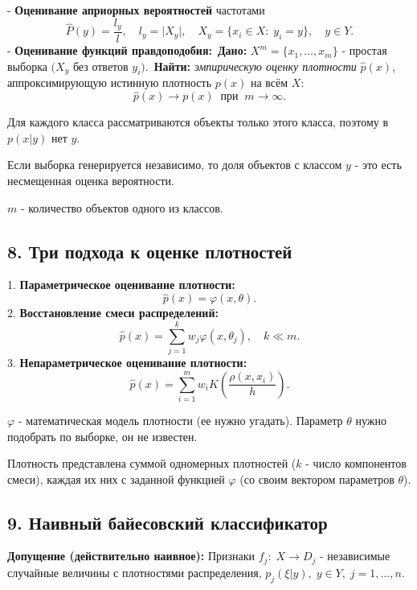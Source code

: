 - \textbf{Оценивание априорных вероятностей} частотами
$$\hat{P}{(y)} = \frac{l_y}{l}, \quad l_y = {\vert X_y \vert}, \quad X_y = {\lbrace x_i \in X : \; y_i = y \rbrace}, \quad y \in Y.$$
- \textbf{Оценивание функций правдоподобия:}\
\textbf{Дано:} $X^{m} = {\lbrace x_1, \ldots, x_m \rbrace}$ - простая выборка $(X_y$ без ответов $y_i)$.\
\textbf{Найти:} \textit{эмпирическую оценку плотности} $\hat{p}{(x)}$, аппроксимирующую
истинную плотность $p{(x)}$ на всём $X$:
$$\hat{p}{(x)} \rightarrow p{(x)} \;\; \text{при} \;\; m \rightarrow \infty.$$


Для каждого класса рассматриваются объекты только этого класса, поэтому в
$p{(x \vert y)}$ нет $y$.

Если выборка генерируется независимо, то доля объектов с классом $y$ - это
есть несмещенная оценка вероятности.

$m$ - количество объектов одного из классов.

\subsection{8. Три подхода к оценке плотностей}

1. \textbf{Параметрическое оценивание плотности:}
$$\hat{p}{(x)} = \varphi{(x, \theta)}.$$
2. \textbf{Восстановление смеси распределений:}
$$\hat{p}{(x)} = \sum_{j=1}^{k}{w_j \varphi{(x, \theta_j)}}, \quad k \ll m.$$
3. \textbf{Непараметрическое оценивание плотности:}
$$\hat{p}{(x)} = \sum_{i=1}^{m}{w_i K{\left( \frac{\rho{(x, x_i)}}{h} \right)}}.$$

$\varphi$ - математическая модель плотности (ее нужно угадать).
Параметр $\theta$ нужно подобрать по выборке, он не известен.

Плотность представлена суммой одномерных плотностей ($k$ - число
компонентов смеси), каждая их них с заданной функцией $\varphi$ (со своим
вектором параметров $\theta$).

\subsection{9. Наивный байесовский классификатор}

\textbf{Допущение (действительно наивное):}
Признаки $f_j : \; X \rightarrow D_j$ - независимые случайные величины с
плотностями распределения,
$p_j{(\xi \vert y)}, \; y \in Y, \; j = 1, \ldots, n$.

